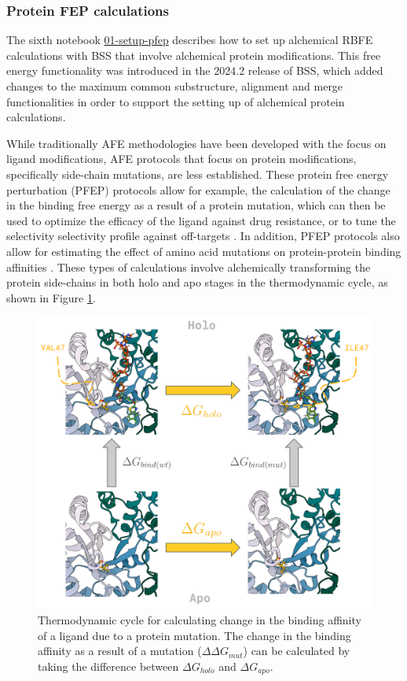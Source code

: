 \subsubsection{Protein FEP calculations}

The sixth notebook \href{https://github.com/OpenBioSim/biosimspace_tutorials/blob/main/04_fep/04_PFEP/01_setup_pfep.ipynb}{01-setup-pfep} describes how to set up alchemical RBFE calculations with BSS that involve alchemical protein modifications. This free energy functionality was introduced in the 2024.2 release of BSS, which added changes to the maximum common substructure, alignment and merge functionalities in order to support the setting up of alchemical protein calculations.

While traditionally AFE methodologies have been developed with the focus on ligand modifications, AFE protocols that focus on protein modifications, specifically side-chain mutations, are less established. These protein free energy perturbation (PFEP) protocols allow for example, the calculation of the change in the binding free energy as a result of a protein mutation, which can then be used to optimize the efficacy of the ligand against drug resistance, or to tune the selectivity selectivity profile against off-targets \cite{doi:10.1021/acscentsci.8b00717}. In addition, PFEP protocols also allow for estimating the effect of amino acid mutations on protein-protein binding affinities \cite{doi:10.1021/acs.jctc.3c00333}. These types of calculations involve alchemically transforming the protein side-chains in both holo and apo stages in the thermodynamic cycle, as shown in Figure \ref{fig:pfep_tcycle}.

\begin{figure}[htp]
\includegraphics[width=\linewidth]{LIVECOMS/04_fep/pfep-tutorial_tcycle.png}
\caption{Thermodynamic cycle for calculating change in the binding affinity of a ligand due to a protein mutation. The change in the binding affinity as a result of a mutation ($\Delta\Delta G_{mut}$) can be calculated by taking the difference between $\Delta G_{holo}$ and $\Delta G_{apo}$.}
\label{fig:pfep_tcycle}
\end{figure}

